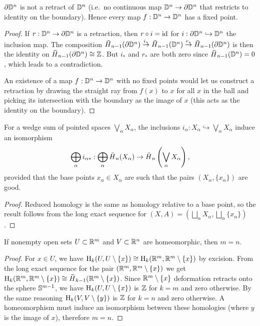 \begin{cor}
    $\partial \mathbb{D}^n$ is not a retract of $\mathbb{D}^n$ (i.e.\ no continuous map $\mathbb{D}^n\to \partial \mathbb{D}^n$ that restricts to identity on the boundary). Hence every map $f:\mathbb{D}^n\to \mathbb{D}^n$ has a fixed point.
\end{cor}
\begin{proof}
     If $r:\mathbb{D}^n\to \partial \mathbb{D}^n$ is a retraction, then $r\circ i=\operatorname{id}$ for $i:\partial \mathbb{D}^n\hookrightarrow \mathbb{D}^n$ the inclusion map. The composition $\wt{H}_{n-1}(\partial \bbD^n)\overset{i_\ast}\to \wt{H}_{n-1}(\bbD^n)\overset{r_\ast}\to \wt{H}_{n-1}(\partial \bbD^n)$ is then the identity on $\wt{H}_{n-1}(\partial \bbD^n)\cong \bbZ$. But $i_\ast$ and $r_\ast$ are both zero since $\wt{H}_{n-1}(\bbD^n)=0$, which leads to a contradiction.
     
     An existence of a map $f:\mathbb{D}^n\to \mathbb{D}^n$ with no fixed points would let us construct a retraction by drawing the straight ray from $f(x)$ to $x$ for all $x$ in the ball and picking its intersection with the boundary as the image of $x$ (this acts as the identity on the boundary).
\end{proof}



\begin{cor}
    For a wedge sum of pointed spaces $\bigvee_{\alpha}X_\alpha$, the inclusions $i_\alpha:X_\alpha\hookrightarrow \bigvee_{\alpha}X_\alpha$ induce an isomorphism 
    \[\bigoplus_\alpha i_{\alpha\ast}:\bigoplus_\alpha\wt{H}_n(X_\alpha)\to \wt{H}_n\left(\bigvee_{\alpha}X_\alpha\right),\]
    provided that the base points $x_\alpha\in X_\alpha$ are such that the pairs $(X_\alpha,\{x_\alpha\})$ are good.
\end{cor}
\begin{proof}
     Reduced homology is the same as homology relative to a base point, so the result follows from the long exact sequence for $(X,A)=\left(\bigsqcup_\alpha X_\alpha, \bigsqcup_\alpha \{x_\alpha\}\right)$.
\end{proof}

\begin{cor}
    If nonempty open sets $U\subset \mathbb{R}^m$ and $V\subset \mathbb{R}^n$ are homeomorphic, then $m=n$.
\end{cor}
\begin{proof}
     For $x\in U$, we have $\mathrm{H}_k(U,U\setminus \{x\})\cong \mathrm{H}_k(\mathbb{R}^m,\mathbb{R}^m\setminus \{x\})$ by excision. From the long exact sequence for the pair $(\mathbb{R}^m,\mathbb{R}^m\setminus\{x\})$ we get $\rmH_k(\bbR^m,\bbR^m\setminus\{x\})\cong \wt{H}_{k-1}(\bbR^m\setminus\{x\})$. Since $\mathbb{R}^m\setminus\{x\}$ deformation retracts onto the sphere $\mathbb{S}^{m-1}$, we have $\mathrm{H}_k(U,U\setminus\{x\})$ is $\mathbb{Z}$ for $k=m$ and zero otherwise. By the same reasoning $\mathrm{H}_k(V,V\setminus\{y\})$ is $\mathbb{Z}$ for $k=n$ and zero otherwise. A homeomorphism must induce an isomorphism between these homologies (where $y$ is the image of $x$), therefore $m=n$.
\end{proof}





